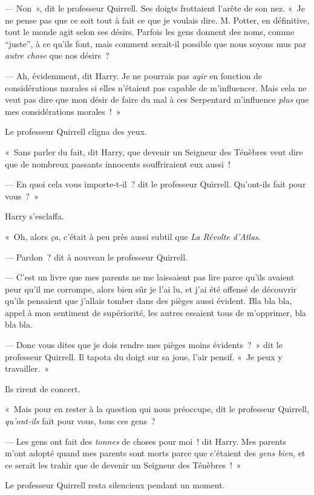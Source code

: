 --- Non~», dit le professeur Quirrell.
Ses doigts frottaient l'arête de son nez.
«~Je ne pense pas que ce soit tout à fait ce que je voulais dire.
M. Potter, en définitive, tout le monde agit selon ses désirs.
Parfois les gens donnent des noms, comme “juste”, à ce qu'ils font, mais comment serait-il possible que nous soyons mus par \emph{autre chose} que nos désirs~?

--- Ah, évidemment, dit Harry.
Je ne pourrais pas \emph{agir} en fonction de considérations morales si elles n'étaient pas capable de m'influencer.
Mais cela ne veut pas dire que mon désir de faire du mal à ces Serpentard m'influence \emph{plus} que mes considérations morales~!~»

Le professeur Quirrell cligna des yeux.

«~Sans parler du fait, dit Harry, que devenir un Seigneur des Ténèbres veut dire que de nombreux passants innocents souffriraient eux aussi~!

--- En quoi cela vous importe-t-il~? dit le professeur Quirrell.
Qu'ont-ils fait pour vous~?~»

Harry s'esclaffa.

«~Oh, alors \emph{ça}, c'était à peu près aussi subtil que \emph{La Révolte d'Atlas}.

--- Pardon~? dit à nouveau le professeur Quirrell.

--- C'est un livre que mes parents ne me laissaient pas lire parce qu'ils avaient peur qu'il me corrompe, alors bien sûr je l'ai lu, et j'ai été offensé de découvrir qu'ils pensaient que j'allais tomber dans des pièges aussi évident.
Bla bla bla, appel à mon sentiment de supériorité, les autres essaient tous de m'opprimer, bla bla bla.

--- Donc vous dites que je dois rendre mes pièges moins évidents~?~»
dit le professeur Quirrell.
Il tapota du doigt sur sa joue, l'air pensif.
«~Je peux y travailler.~»

Ils rirent de concert.

«~Mais pour en rester à la question qui nous préoccupe, dit le professeur Quirrell, \emph{qu'ont-ils} fait pour vous, tous ces gens~?

--- Les gens ont fait des \emph{tonnes} de choses pour moi~! dit Harry.
Mes parents m'ont adopté quand mes parents sont morts parce que c'étaient des \emph{gens bien}, et ce serait les trahir que de devenir un Seigneur des Ténèbres~!~»

Le professeur Quirrell resta silencieux pendant un moment.


